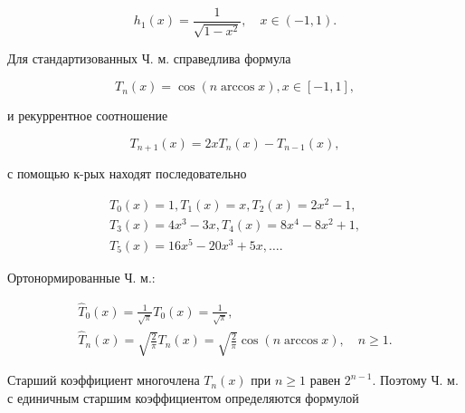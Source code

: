 \documentclass[10pt]{article}
\begin{document}
\[

h_{1}(x)=\frac{1}{\sqrt{1-x^{2}}}, \quad x \in(-1,1) .

\]



Для стандартизованных Ч. м. справедлива формула



\[

T_{n}(x)=\cos (n \arccos x), x \in[-1,1],

\]



и рекуррентное соотношение



\[

T_{n+1}(x)=2 x T_{n}(x)-T_{n-1}(x),

\]



с помощью к-рых находят последовательно



\[

\begin{gathered}

T_{0}(x)=1, T_{1}(x)=x, T_{2}(x)=2 x^{2}-1, \\

T_{3}(x)=4 x^{3}-3 x, T_{4}(x)=8 x^{4}-8 x^{2}+1, \\

T_{5}(x)=16 x^{5}-20 x^{3}+5 x, \ldots .

\end{gathered}

\]



Ортонормированные Ч. м.:



\[

\begin{gathered}

\hat{T}_{0}(x)=\frac{1}{\sqrt{\pi}} T_{0}(x)=\frac{1}{\sqrt{\pi}}, \\

\hat{T}_{n}(x)=\sqrt{\frac{2}{\pi}} T_{n}(x)=\sqrt{\frac{2}{\pi}} \cos (n \arccos x), \quad n \geqslant 1 .

\end{gathered}

\]



Старший коэффициент многочлена $T_{n}(x)$ при $n \geqslant 1$ равен $2^{n-1}$. Поэтому Ч. м. с единичным старшим коэффициентом определяются формулой
\end{document}
